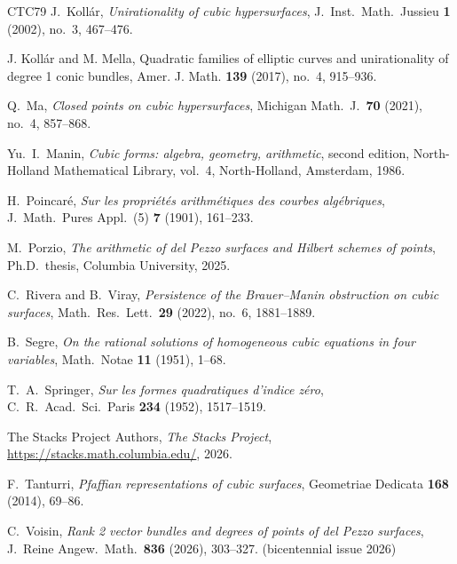 \documentclass[a4paper,11pt]{amsart}
\numberwithin{equation}{section}
\theoremstyle{definition}
\theoremstyle{remark}
\begin{document}
\begin{thebibliography}{CTC79}
J.\ Koll\'ar,
{\em Unirationality of cubic hypersurfaces},
J.\ Inst.\ Math.\ Jussieu \textbf{1} (2002), no.\ 3, 467--476.

J. Koll\'ar and M. Mella,
Quadratic families of elliptic curves and unirationality
of degree 1 conic bundles,
Amer. J. Math. \textbf{139} (2017), no.~4, 915--936.

Q.\ Ma,
{\em Closed points on cubic hypersurfaces},
Michigan Math.\ J.\ \textbf{70} (2021), no.\ 4, 857--868.

Yu.\ I.\ Manin,
{\em Cubic forms: algebra, geometry, arithmetic},
second edition, North-Holland Mathematical Library,
vol.\ 4, North-Holland, Amsterdam, 1986.

H.\ Poincar\'e, {\em Sur les propri\'et\'es arithm\'etiques des courbes
alg\'ebriques}, J.\ Math.\ Pures Appl.\ (5) \textbf{7} (1901), 161--233.

M.\ Porzio,
{\em The arithmetic of del Pezzo surfaces and Hilbert schemes of points},
Ph.D.\ thesis, Columbia University, 2025.

C.\ Rivera and B.\ Viray,
{\em Persistence of the Brauer--Manin obstruction on cubic surfaces},
Math.\ Res.\ Lett.\ \textbf{29} (2022), no.\ 6, 1881--1889.

B.\ Segre, {\em On the rational solutions of homogeneous cubic
equations in four variables}, Math.\ Notae \textbf{11} (1951), 1--68.

T.\ A.\ Springer,
{\em Sur les formes quadratiques d'indice z\'ero},
C.\ R.\ Acad.\ Sci.\ Paris \textbf{234} (1952), 1517--1519.

The Stacks Project Authors,
{\em The Stacks Project},
\url{https://stacks.math.columbia.edu/}, 2026.

F.\ Tanturri,
\emph{Pfaffian representations of cubic surfaces},
Geometriae Dedicata \textbf{168} (2014), 69--86.

C.\ Voisin,
{\em Rank 2 vector bundles and degrees of points of del Pezzo surfaces},
J.\ Reine Angew.\ Math.\ \textbf{836} (2026), 303--327. (bicentennial issue 2026)


\end{thebibliography}
\end{document}

